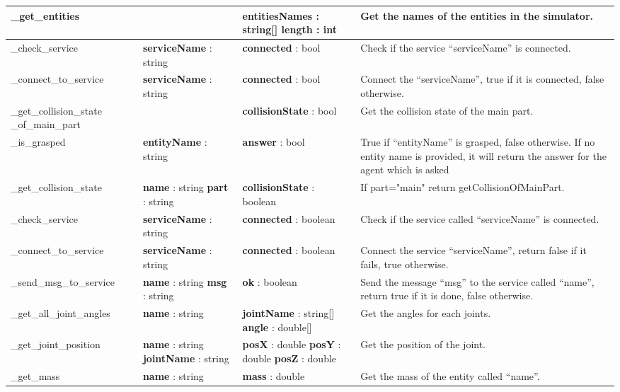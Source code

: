 \documentclass[notitlepage]{report}
\begin{document}
\begin{supertabular}{|p{2.9cm}|p{2.5cm}|p{3cm}|p{5.5cm}|}
  	\hline
  	\_get\_entities & &
  		\textbf{entitiesNames} : string[] \newline
  		\textbf{length} : int
    & Get the names of the entities in the simulator.\\
  	\hline
  	\_check\_service & \textbf{serviceName} : string & \textbf{connected} : bool & Check if the service ``serviceName'' is connected.\\
  	\hline
  	\_connect\_to\_service & \textbf{serviceName} : string & \textbf{connected} : bool & Connect the ``serviceName'', true if it is connected, false otherwise.\\
  	\hline
  	\_get\_collision\_state \_of\_main\_part & & \textbf{collisionState} : bool & Get the collision state of the main part.\\
  	\hline
  	\_is\_grasped & \textbf{entityName} : string & \textbf{answer} : bool & True if ``entityName'' is grasped, false otherwise. If no entity name is provided, it will return the answer for the agent which is asked\\
  	\hline
  	\_get\_collision\_state & 
  		\textbf{name} : string \newline
  		\textbf{part} : string
  		& \textbf{collisionState} : boolean & If part="main" return getCollisionOfMainPart.\\
  	\hline
  	\_check\_service & 
  		\textbf{serviceName} : string
  		& \textbf{connected} : boolean & Check if the service called ``serviceName'' is connected.\\
  	\hline
  	\_connect\_to\_service & 
  		\textbf{serviceName} : string
  		& \textbf{connected} : boolean & Connect the service ``serviceName'', return false if it fails, true otherwise.\\
  	\hline
  	\_send\_msg\_to\_service & 
  		\textbf{name} : string \newline
  		\textbf{msg} : string
  		& \textbf{ok} : boolean & Send the message ``msg'' to the service called ``name'', return true if it is done, false otherwise.\\
  	\hline
  	\_get\_all\_joint\_angles & 
  		\textbf{name} : string
  		& \textbf{jointName} : string[] \newline
  		  \textbf{angle} : double[]
  		& Get the angles for each joints.\\
  	\hline
  	\_get\_joint\_position & 
  		\textbf{name} : string \newline
  		\textbf{jointName} : string
  		&
  		  \textbf{posX} : double \newline
  		  \textbf{posY} : double \newline
  		  \textbf{posZ} : double
  		& Get the position of the joint.\\
  	\hline
  	\_get\_mass & 
  		\textbf{name} : string
  		&
  		  \textbf{mass} : double
  		& Get the mass of the entity called ``name''.\\
  	\hline
\end{supertabular}
\end{document}
